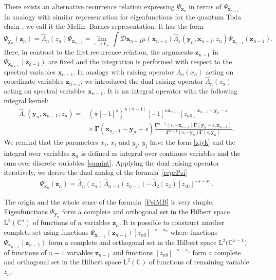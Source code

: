 \documentclass[pdftex]{sigma}
\numberwithin{equation}{section}
\begin{document}
There exists an alternative recurrence relation expressing
$\Psi_{\bm{x}_n}$ in terms of $\Psi_{\bm{x}_{n-1}}$.
In analogy with similar representation for eigenfunctions for
the quantum Toda chain \cite{KL1, KL2,KK}, we call it the Mellin--Barnes representation.
It has the form \cite{Val20}
\begin{equation} \label{PsiMB}
\Psi_{\bm{y}_n}(\bm{z}_n) = \hat{\Lambda}_n(z_n) \Psi_{\bm{x}_{n-1}} =
\lim\limits_{\varepsilon\to 0_+}
\int \mathcal{D}\bm{x}_{n-1}
\mu(\bm{x}_{n-1})
\hat{\Lambda}_\varepsilon(\bm{y}_{n},\bm{x}_{n-1}; z_n)
\Psi_{\bm{x}_{n-1}}(\bm{z}_{n-1}) .
\end{equation}
Here, in contrast to the first recurrence relation, the arguments $\bm{z}_{n-1}$ in $\Psi_{\bm{x}_{n-1}}(\bm z_{k-1})$ are fixed and the integration is performed with respect to the spectral variables $\bm{x}_{n-1}$.
In analogy with raising operator $\Lambda_n( x_n)$ acting on coordinate variables $\bm{z}_{n-1}$, we introduced the dual raising operator $\hat{\Lambda}_n(z_n)$ acting on
spectral variables $\bm{x}_{n-1}$.
It is an integral operator with the following integral kernel:
\begin{align}
\nonumber
\hat{\Lambda}_\varepsilon(\bm{y}_{n},\bm{x}_{n-1};z_n) ={}&
(\pi [-1]^{s})^{n(n-1)} [-1]^{n\underline{\bm{x}_{n-1}}}
[z_{n0}]^{\underline{\bm{x}_{n-1}}-\underline{\bm{y}_n}-s} \\
&\label{dual}
{\times}\,
\mathbf{\Gamma}(\underline{\bm{x}_{n-1}}-\underline{\bm{y}_n}+s) 	\frac{\mathbf{\Gamma}^{n-1}(s ,-\bm{x}_{n-1})
\mathbf{\Gamma}(\bm{y}_n+\varepsilon,\bm{x}_{n-1})}
{\mathbf{\Gamma}^{n-1}(s ,-\bm{y}_n) \mathbf{\Gamma}(s ,\bm{y}_n)} .
\end{align}
We remind that the parameters $x_i$, $\bar{x}_i$ and $y_j$, $\bar{y}_j$ have the form
\eqref{xjyk} and the integral over variables $\bm{x}_n$ is defined
as integral over continues variables and the sum over discrete variables~\eqref{sumint}.
Applying the dual raising operator iteratively, we derive
the dual analog of the formula~\eqref{reprPsi}
\begin{align*}
\Psi_{\bm{x}_n}(\bm z_n) =
\hat{\Lambda}_n( z_n)
\hat{\Lambda}_{n-1}( z_{n-1})\cdots
\hat{\Lambda}_{2}(z_{2}) [z_{10}]^{-s-x_1} .
\end{align*}

The origin and the whole sense of the formula~\eqref{PsiMB} is very simple.
Eigenfunctions $\Psi_{\bm{y}_n}$ form a complete and orthogonal set in the Hilbert space $\mathrm{L}^2(\mathbb{C}^n)$ of functions of $n$ variables $\bm{z}_n$.
It is possible to construct another complete set using functions $\Psi_{\bm{x}_{n-1}}(\bm{z}_{n-1}) [z_{n0}]^{-s-x_n}$ where functions $\Psi_{\bm{x}_{n-1}}(\bm{z}_{n-1})$ form a complete and orthogonal set in the Hilbert space $\mathrm{L}^2\bigl(\mathbb{C}^{n-1}\bigr)$ of functions of $n-1$ variables $\bm{z}_{n-1}$ and
functions $[z_{n0}]^{-s-x_n}$ form a complete and orthogonal set in the Hilbert space $\mathrm{L}^2(\mathbb{C})$ of functions of remaining variable $z_n$.
\end{document}
